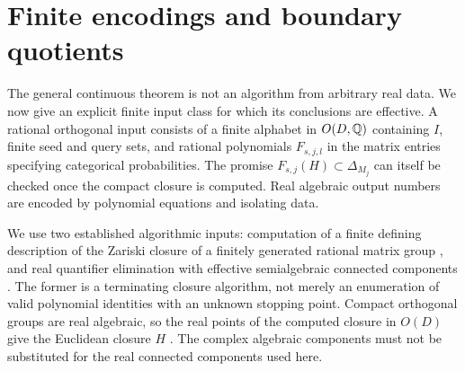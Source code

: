 \section{Finite encodings and boundary quotients}\label{sec:effective54}
The general continuous theorem is not an algorithm from arbitrary real data. We now give an explicit finite input class for which its conclusions are effective. A rational orthogonal input consists of a finite alphabet in $O(D,\mathbb Q)$ containing $I$, finite seed and query sets, and rational polynomials $F_{s,j,l}$ in the matrix entries specifying categorical probabilities. The promise $F_{s,j}(H)\subset\Delta_{M_j}$ can itself be checked once the compact closure is computed. Real algebraic output numbers are encoded by polynomial equations and isolating data.

We use two established algorithmic inputs: computation of a finite defining description of the Zariski closure of a finitely generated rational matrix group \cite{DJK,NPSW}, and real quantifier elimination with effective semialgebraic connected components \cite{BPR}. The former is a terminating closure algorithm, not merely an enumeration of valid polynomial identities with an unknown stopping point. Compact orthogonal groups are real algebraic, so the real points of the computed closure in $O(D)$ give the Euclidean closure $H$ \cite{BJKP}. The complex algebraic components must not be substituted for the real connected components used here.

